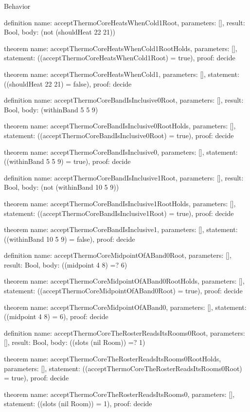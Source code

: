 \begin{lexlean}{Behavior}
\begin{semanticmodule}
definition{
  name: acceptThermoCoreHeatsWhenCold1Root,
  parameters: [],
  result: Bool,
  body: (not (shouldHeat 22 21))
}

theorem{
  name: acceptThermoCoreHeatsWhenCold1RootHolds,
  parameters: [],
  statement: ((acceptThermoCoreHeatsWhenCold1Root) = true),
  proof: decide{}
}

theorem{
  name: acceptThermoCoreHeatsWhenCold1,
  parameters: [],
  statement: ((shouldHeat 22 21) = false),
  proof: decide{}
}

definition{
  name: acceptThermoCoreBandIsInclusive0Root,
  parameters: [],
  result: Bool,
  body: (withinBand 5 5 9)
}

theorem{
  name: acceptThermoCoreBandIsInclusive0RootHolds,
  parameters: [],
  statement: ((acceptThermoCoreBandIsInclusive0Root) = true),
  proof: decide{}
}

theorem{
  name: acceptThermoCoreBandIsInclusive0,
  parameters: [],
  statement: ((withinBand 5 5 9) = true),
  proof: decide{}
}

definition{
  name: acceptThermoCoreBandIsInclusive1Root,
  parameters: [],
  result: Bool,
  body: (not (withinBand 10 5 9))
}

theorem{
  name: acceptThermoCoreBandIsInclusive1RootHolds,
  parameters: [],
  statement: ((acceptThermoCoreBandIsInclusive1Root) = true),
  proof: decide{}
}

theorem{
  name: acceptThermoCoreBandIsInclusive1,
  parameters: [],
  statement: ((withinBand 10 5 9) = false),
  proof: decide{}
}

definition{
  name: acceptThermoCoreMidpointOfABand0Root,
  parameters: [],
  result: Bool,
  body: ((midpoint 4 8) =? 6)
}

theorem{
  name: acceptThermoCoreMidpointOfABand0RootHolds,
  parameters: [],
  statement: ((acceptThermoCoreMidpointOfABand0Root) = true),
  proof: decide{}
}

theorem{
  name: acceptThermoCoreMidpointOfABand0,
  parameters: [],
  statement: ((midpoint 4 8) = 6),
  proof: decide{}
}

definition{
  name: acceptThermoCoreTheRosterReadsItsRooms0Root,
  parameters: [],
  result: Bool,
  body: ((slots (nil Room)) =? 1)
}

theorem{
  name: acceptThermoCoreTheRosterReadsItsRooms0RootHolds,
  parameters: [],
  statement: ((acceptThermoCoreTheRosterReadsItsRooms0Root) = true),
  proof: decide{}
}

theorem{
  name: acceptThermoCoreTheRosterReadsItsRooms0,
  parameters: [],
  statement: ((slots (nil Room)) = 1),
  proof: decide{}
}


\end{semanticmodule}
\end{lexlean}
